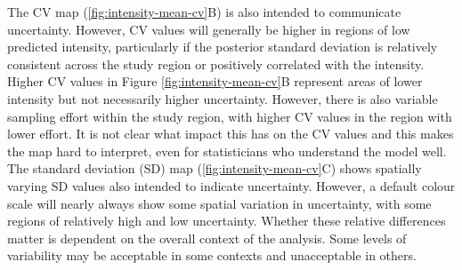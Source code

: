 \documentclass{statsoc}
\begin{document}
The CV map (\autoref{fig:intensity-mean-cv}B) is also intended to communicate uncertainty.  However, CV values will generally be higher in regions of low predicted intensity, particularly if the posterior standard deviation is relatively consistent across the study region or positively correlated with the intensity.  Higher CV values in Figure \ref{fig:intensity-mean-cv}B represent areas of lower intensity but not necessarily higher uncertainty.  However, there is also variable sampling effort within the study region, with higher CV values in the region with lower effort.  It is not clear what impact this has on the CV values and this makes the map hard to interpret, even for statisticians who understand the model well. The standard deviation (SD) map (\autoref{fig:intensity-mean-cv}C) shows spatially varying SD values also intended to indicate uncertainty.  However, a default colour scale will nearly always show some spatial variation in uncertainty, with some regions of relatively high and low uncertainty.  Whether these relative differences matter is dependent on the overall context of the analysis.  Some levels of variability may be acceptable in some contexts and unacceptable in others.  
\end{document}
